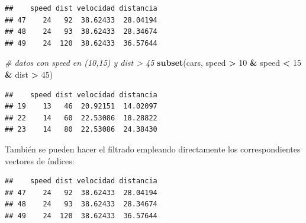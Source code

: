 \documentclass[
]{book}
\newenvironment{Shaded}{\begin{snugshade}}{\end{snugshade}}
\newcommand{\CommentTok}[1]{\textcolor[rgb]{0.56,0.35,0.01}{\textit{#1}}}
\newcommand{\DecValTok}[1]{\textcolor[rgb]{0.00,0.00,0.81}{#1}}
\newcommand{\FunctionTok}[1]{\textcolor[rgb]{0.13,0.29,0.53}{\textbf{#1}}}
\newcommand{\NormalTok}[1]{#1}
\newcommand{\OtherTok}[1]{\textcolor[rgb]{0.56,0.35,0.01}{#1}}
\newcommand{\SpecialCharTok}[1]{\textcolor[rgb]{0.81,0.36,0.00}{\textbf{#1}}}
\begin{document}
\begin{verbatim}
##    speed dist velocidad distancia
## 47    24   92  38.62433  28.04194
## 48    24   93  38.62433  28.34674
## 49    24  120  38.62433  36.57644
\end{verbatim}

\begin{Shaded}
\begin{Highlighting}[]
\CommentTok{\# datos con speed en (10,15) y dist \textgreater{} 45}
\FunctionTok{subset}\NormalTok{(cars, speed }\SpecialCharTok{\textgreater{}} \DecValTok{10} \SpecialCharTok{\&}\NormalTok{ speed }\SpecialCharTok{\textless{}} \DecValTok{15} \SpecialCharTok{\&}\NormalTok{ dist }\SpecialCharTok{\textgreater{}} \DecValTok{45}\NormalTok{)}
\end{Highlighting}
\end{Shaded}

\begin{verbatim}
##    speed dist velocidad distancia
## 19    13   46  20.92151  14.02097
## 22    14   60  22.53086  18.28822
## 23    14   80  22.53086  24.38430
\end{verbatim}

También se pueden hacer el filtrado empleando directamente los
correspondientes vectores de índices:

\begin{Shaded}
\end{Shaded}

\begin{verbatim}
##    speed dist velocidad distancia
## 47    24   92  38.62433  28.04194
## 48    24   93  38.62433  28.34674
## 49    24  120  38.62433  36.57644
\end{verbatim}

\begin{Shaded}
\end{Shaded}
\end{document}
